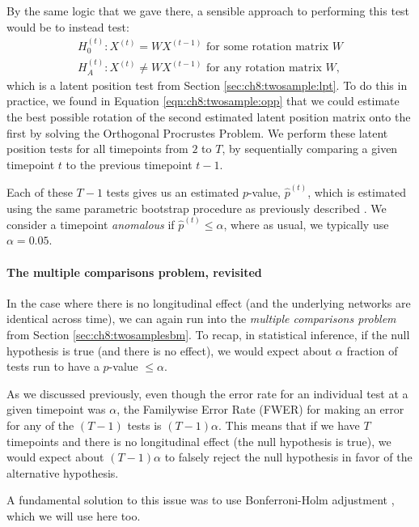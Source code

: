 By the same logic that we gave there, a sensible approach to performing this test would be to instead test:
\begin{align*}
    H_0^{(t)} : X^{(t)} = WX^{(t - 1)} \text{ for some rotation matrix }W \\
    H_A^{(t)}: X^{(t)} \neq WX^{(t - 1)} \text{ for any rotation matrix }W,
\end{align*}
which is a latent position test from Section \ref{sec:ch8:twosample:lpt}. To do this in practice, we found in Equation \eqref{eqn:ch8:twosample:opp} that we could estimate the best possible rotation of the second estimated latent position matrix onto the first by solving the Orthogonal Procrustes Problem. We perform these latent position tests for all timepoints from $2$ to $T$, by sequentially comparing a given timepoint $t$ to the previous timepoint $t - 1$.

Each of these $T - 1$ tests gives us an estimated $p$-value, $\hat p^{(t)}$, which is estimated using the same parametric bootstrap procedure as previously described \cite{Tang2017Apr}. We consider a timepoint \textit{anomalous} if $\hat p^{(t)} \leq \alpha$, where as usual, we typically use $\alpha = 0.05$.

\paragraph*{The multiple comparisons problem, revisited}

In the case where there is no longitudinal effect (and the underlying networks are identical across time), we can again run into the \textit{multiple comparisons problem} from Section \ref{sec:ch8:twosamplesbm}. To recap, in statistical inference, if the null hypothesis is true (and there is no effect), we would expect about $\alpha$ fraction of tests run to have a $p$-value $\leq \alpha$. 

As we discussed previously, even though the error rate for an individual test at a given timepoint was $\alpha$, the Familywise Error Rate (FWER) for making an error for any of the $(T - 1)$ tests is $(T - 1)\alpha$. This means that if we have $T$ timepoints and there is no longitudinal effect (the null hypothesis is true), we would expect about $(T - 1)\alpha$ to falsely reject the null hypothesis in favor of the alternative hypothesis.

A fundamental solution to this issue was to use Bonferroni-Holm adjustment \cite{Holm1979}, which we will use here too.

